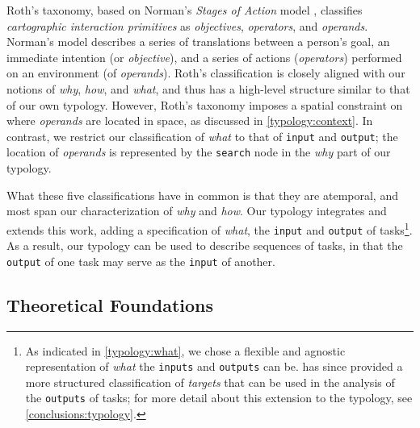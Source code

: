 Roth's taxonomy, based on Norman's {\it Stages of Action} model \cite{Norman1988}, classifies {\it cartographic interaction primitives} as {\it objectives}, {\it operators}, and {\it operands}.
Norman's model describes a series of translations between a person's goal, an immediate intention (or {\it objective}), and a series of actions ({\it operators}) performed on an environment (of {\it operands}).
Roth's classification is closely aligned with our notions of {\it why}, {\it how}, and {\it what}, and thus has a high-level structure similar to that of our own typology.
However, Roth's taxonomy imposes a spatial constraint on where {\it operands} are located in space, as discussed in \autoref{typology:context}.
In contrast, we restrict our classification of {\it what} to that of {\tt input} and {\tt output}; the location of {\it operands} is represented by the {\tt search} node in the {\it why} part of our typology.

What these five classifications have in common is that they are atemporal, and most span our characterization of {\it why} and {\it how}.
Our typology integrates and extends this work, adding a specification of {\it what}, the {\tt input} and {\tt output} of tasks\footnote{As indicated in \autoref{typology:what}, we chose a flexible and agnostic representation of {\it what} the {\tt inputs} and {\tt outputs} can be. \citet{Munzner2014} has since provided a more structured classification of {\it targets} that can be used in the analysis of the {\tt outputs} of tasks; for more detail about this extension to the typology, see \autoref{conclusions:typology}.}.
As a result, our typology can be used to describe sequences of tasks, in that the {\tt output} of one task may serve as the {\tt input} of another.


\subsection{Theoretical Foundations}
\label{typology:rw:theory}


